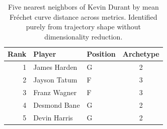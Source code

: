 \begin{table}[htbp]
  \centering\small
  \begin{tabular}{rllc}
    \toprule
    Rank & Player & Position & Archetype \\
    \midrule
    1 & James Harden & G & 2 \\
    2 & Jayson Tatum & F & 3 \\
    3 & Franz Wagner & F & 3 \\
    4 & Desmond Bane & G & 2 \\
    5 & Devin Harris & G & 2 \\
    \bottomrule
  \end{tabular}
  \caption{Five nearest neighbors of Kevin Durant by mean Fr\'{e}chet curve distance across metrics. Identified purely from trajectory shape without dimensionality reduction.}
  \label{tab:Kevin_Durant_frechet_curve_neighbors}
\end{table}

